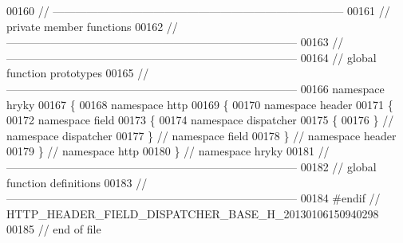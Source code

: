 \begin{DoxyCode}
00160 \textcolor{comment}{//
      ------------------------------------------------------------------------------}
00161 \textcolor{comment}{// private member functions}
00162 \textcolor{comment}{//
      ------------------------------------------------------------------------------}
00163 \textcolor{comment}{//
      ------------------------------------------------------------------------------}
00164 \textcolor{comment}{// global function prototypes}
00165 \textcolor{comment}{//
      ------------------------------------------------------------------------------}
00166 \textcolor{keyword}{namespace }hryky
00167 \{
00168 \textcolor{keyword}{namespace }http
00169 \{
00170 \textcolor{keyword}{namespace }header
00171 \{
00172 \textcolor{keyword}{namespace }field
00173 \{
00174 \textcolor{keyword}{namespace }dispatcher
00175 \{
00176 \} \textcolor{comment}{// namespace dispatcher}
00177 \} \textcolor{comment}{// namespace field}
00178 \} \textcolor{comment}{// namespace header}
00179 \} \textcolor{comment}{// namespace http}
00180 \} \textcolor{comment}{// namespace hryky}
00181 \textcolor{comment}{//
      ------------------------------------------------------------------------------}
00182 \textcolor{comment}{// global function definitions}
00183 \textcolor{comment}{//
      ------------------------------------------------------------------------------}
00184 \textcolor{preprocessor}{#endif // HTTP\_HEADER\_FIELD\_DISPATCHER\_BASE\_H\_20130106150940298}
00185 \textcolor{preprocessor}{}\textcolor{comment}{// end of file}
\end{DoxyCode}
